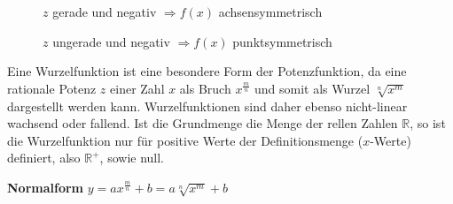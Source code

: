 \begin{figure}[h!]
\begin{floatrow}
{
		} {\caption*{$z$ gerade und negativ $\Rightarrow f(x)$ achsensymmetrisch}}

		\ffigbox
		{
		} {\caption*{$z$ ungerade und negativ $\Rightarrow f(x)$ punktsymmetrisch}}
	\end{floatrow}
\end{figure}

\pagebreak


Eine Wurzelfunktion ist eine besondere Form der Potenzfunktion, da eine rationale Potenz $z$ einer Zahl $x$ als Bruch $x^{\frac{m}{n}}$ und somit als Wurzel $\sqrt[n]{x^m}$ dargestellt werden kann. Wurzelfunktionen sind daher ebenso nicht-linear wachsend oder fallend. Ist die Grundmenge die Menge der rellen Zahlen $\mathbb{R}$, so ist die Wurzelfunktion nur f\"{u}r positive Werte der Definitionsmenge ($x$-Werte) definiert, also $\mathbb{R^+}$, sowie null.

\textbf{Normalform}  $y = ax^{\frac{m}{n}} + b = a\sqrt[n]{x^m} + b$

